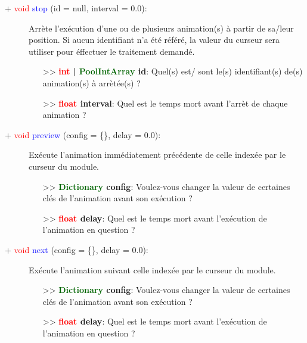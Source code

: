 \documentclass[a4paper, 11pt]{article}
\begin{document}
	\begin{description}
		\item [+ \textcolor{red}{void} \textcolor{blue}{stop} (id = null, interval = 0.0):] Arrète 
		l'exécution d'une ou de plusieurs animation(s) à partir de sa/leur position. Si aucun identifiant
		n'a été référé, la valeur du curseur sera utiliser pour éffectuer le traitement demandé.
		\begin{itemize}
			\item [>> \textbf{\textcolor{red}{int} | \textcolor{darkgreen}{PoolIntArray} id}:] Quel(s) est/
			sont le(s) identifiant(s) de(s) animation(s) à arrètée(s) ?
			\item [>> \textbf{\textcolor{red}{float} interval}:] Quel est le temps mort avant l'arrèt de 
			chaque animation ?\\
		\end{itemize}
	\end{description}
	\begin{description}
		\item [+ \textcolor{red}{void} \textcolor{blue}{preview} (config = \{\}, delay = 0.0):] Exécute
		l'animation immédiatement précédente de celle indexée par le curseur du module.
		\begin{itemize}
			\item [>> \textbf{\textcolor{darkgreen}{Dictionary} config}:] Voulez-vous changer la valeur de
			certaines clés de l'animation avant son exécution ?
			\item [>> \textbf{\textcolor{red}{float} delay}:] Quel est le temps mort avant l'exécution de 
			l'animation en question ?\\
		\end{itemize}
	\end{description}
	\begin{description}
		\item [+ \textcolor{red}{void} \textcolor{blue}{next} (config = \{\}, delay = 0.0):] Exécute 
		l'animation suivant celle indexée par le curseur du module.
		\begin{itemize}
			\item [>> \textbf{\textcolor{darkgreen}{Dictionary} config}:] Voulez-vous changer la valeur de
			certaines clés de l'animation avant son exécution ?
			\item [>> \textbf{\textcolor{red}{float} delay}:] Quel est le temps mort avant l'exécution de 
			l'animation en question ?\\
		\end{itemize}
	\end{description}
\end{document}
